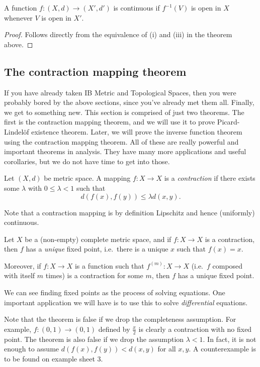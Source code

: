 \documentclass[a4paper]{article}
\begin{document}
\begin{cor}
  A function $f: (X, d) \to (X', d')$ is continuous if $f^{-1}(V)$ is open in $X$ whenever $V$ is open in $X'$.
\end{cor}

\begin{proof}
  Follows directly from the equivalence of (i) and (iii) in the theorem above.
\end{proof}

\subsection{The contraction mapping theorem}
If you have already taken IB Metric and Topological Spaces, then you were probably bored by the above sections, since you've already met them all. Finally, we get to something new. This section is comprised of just two theorems. The first is the contraction mapping theorem, and we will use it to prove Picard-Lindel\"of existence theorem. Later, we will prove the inverse function theorem using the contraction mapping theorem. All of these are really powerful and important theorems in analysis. They have many more applications and useful corollaries, but we do not have time to get into those.

\begin{defi}
  Let $(X, d)$ be metric space. A mapping $f: X \to X$ is a \emph{contraction} if there exists some $\lambda$ with $0 \leq \lambda < 1$ such that
  \[
    d(f(x), f(y)) \leq \lambda d(x, y).
  \]
\end{defi}
Note that a contraction mapping is by definition Lipschitz and hence (uniformly) continuous.

\begin{thm}
  Let $X$ be a (non-empty) complete metric space, and if $f: X \to X$ is a contraction, then $f$ has a \emph{unique} fixed point, i.e.\ there is a unique $x$ such that $f(x) = x$.

  Moreover, if $f: X\to X$ is a function such that $f^{(m)}: X\to X$ (i.e.\ $f$ composed with itself $m$ times) is a contraction for some $m$, then $f$ has a unique fixed point.
\end{thm}
We can see finding fixed points as the process of solving equations. One important application we will have is to use this to solve \emph{differential} equations.

Note that the theorem is false if we drop the completeness assumption. For example, $f: (0, 1) \to (0, 1)$ defined by $\frac{x}{2}$ is clearly a contraction with no fixed point. The theorem is also false if we drop the assumption $\lambda < 1$. In fact, it is not enough to assume $d(f(x), f(y)) < d(x, y)$ for all $x, y$. A counterexample is to be found on example sheet 3.
\end{document}
